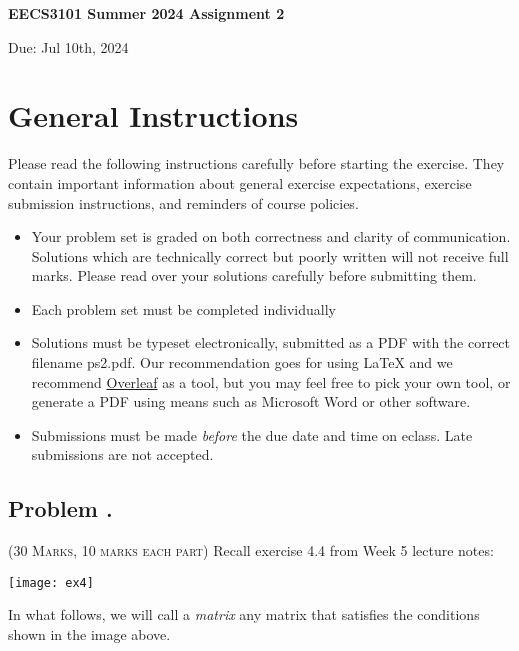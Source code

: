 \documentclass[12pt]{article}
\newcounter{ProblemNum}
\renewcommand{\theProblemNum}{\arabic{ProblemNum}}
\newcommand*{\anyproblem}[1]{\newpage\subsection*{#1}}
\newcommand*{\problem}[1]{\stepcounter{ProblemNum} %
\anyproblem{Problem \theProblemNum. \; #1}}
\begin{document}
\begin{center}
\begin{Large}
  \textbf{EECS3101 Summer 2024 Assignment 2 }\\
\end{Large}
\begin{large}
	Due: Jul 10th, 2024
\end{large}
\end{center}

\section*{General Instructions}
Please read the following instructions carefully before starting the exercise. They contain important
information about general exercise expectations, exercise submission instructions,
and reminders of course policies.

\begin{itemize}
\item Your problem set is graded on both correctness and clarity of communication. Solutions
which are technically correct but poorly written will not receive full marks. Please read over
your solutions carefully before submitting them.

\item Each problem set must be completed individually

\item Solutions must be typeset electronically, submitted as a PDF with the correct filename ps2.pdf. Our recommendation goes for using {\LaTeX}  and we recommend \href{https://www.overleaf.com/}{Overleaf} as a tool, but you may feel free to pick your own tool, or generate a PDF using means such as Microsoft Word or other software.


\item Submissions must be made \emph{before} the due date and time on eclass. Late submissions are not accepted.

\end{itemize}



\problem{}
\textsc{(30 Marks, 10 marks each part)} Recall exercise 4.4 from Week 5 lecture notes:

\vskip5pt

\texttt{[image: ex4]}

\vskip5pt

In what follows, we will call a \emph{matrix} any matrix that satisfies the conditions shown in the image above.
\end{document}
